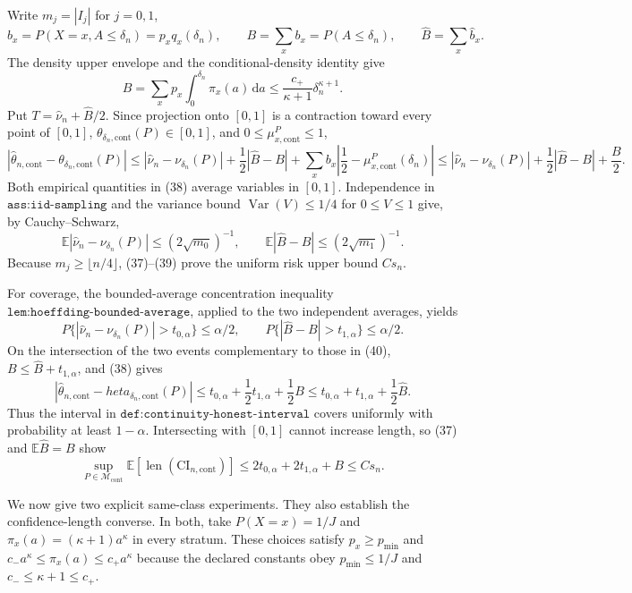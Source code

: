 Write \(m_j=|I_j|\) for \(j=0,1\),
\[
 b_x=P(X=x,A\leq\delta_n)=p_xq_x(\delta_n),
 \qquad B=\sum_xb_x=P(A\leq\delta_n),
 \qquad \widehat B=\sum_x\widehat b_x. \tag{36}
\]
The density upper envelope and the conditional-density identity give
\[
 B=\sum_xp_x\int_0^{\delta_n}\pi_x(a)\,\mathrm da
 \leq \frac{c_+}{\kappa+1}\delta_n^{\kappa+1}. \tag{37}
\]
Put \(T=\widehat\nu_n+\widehat B/2\).  Since projection onto \([0,1]\) is a contraction toward every point of \([0,1]\), \(\theta_{\delta_n,\mathrm{cont}}(P)\in[0,1]\), and \(0\leq\mu_{x,\mathrm{cont}}^P\leq1\),
\[
 |\widehat\theta_{n,\mathrm{cont}}-\theta_{\delta_n,\mathrm{cont}}(P)|
 \leq |\widehat\nu_n-\nu_{\delta_n}(P)|
 +\frac12|\widehat B-B|
 +\sum_xb_x\left|\frac12-\mu_{x,\mathrm{cont}}^P(\delta_n)\right|
 \leq |\widehat\nu_n-\nu_{\delta_n}(P)|+\frac12|\widehat B-B|+\frac B2. \tag{38}
\]
Both empirical quantities in (38) average variables in \([0,1]\).  Independence in \(\texttt{ass:iid-sampling}\) and the variance bound \(\operatorname{Var}(V)\leq1/4\) for \(0\leq V\leq1\) give, by Cauchy--Schwarz,
\[
 \mathbb E|\widehat\nu_n-\nu_{\delta_n}(P)|\leq(2\sqrt{m_0})^{-1},
 \qquad
 \mathbb E|\widehat B-B|\leq(2\sqrt{m_1})^{-1}. \tag{39}
\]
Because \(m_j\geq\lfloor n/4\rfloor\), (37)--(39) prove the uniform risk upper bound \(Cs_n\).

For coverage, the bounded-average concentration inequality \(\texttt{lem:hoeffding-bounded-average}\), applied to the two independent averages, yields
\[
 P\{|\widehat\nu_n-\nu_{\delta_n}(P)|>t_{0,\alpha}\}\leq\alpha/2,
 \qquad
 P\{|\widehat B-B|>t_{1,\alpha}\}\leq\alpha/2. \tag{40}
\]
On the intersection of the two events complementary to those in (40), \(B\leq\widehat B+t_{1,\alpha}\), and (38) gives
\[
 |\widehat\theta_{n,\mathrm{cont}}-  heta_{\delta_n,\mathrm{cont}}(P)|
 \leq t_{0,\alpha}+\frac12t_{1,\alpha}+\frac12B
 \leq t_{0,\alpha}+t_{1,\alpha}+\frac12\widehat B. \tag{41}
\]
Thus the interval in \(\texttt{def:continuity-honest-interval}\) covers uniformly with probability at least \(1-\alpha\).  Intersecting with \([0,1]\) cannot increase length, so (37) and \(\mathbb E\widehat B=B\) show
\[
 \sup_{P\in\mathcal M_{\mathrm{cont}}}
 \mathbb E[\operatorname{len}(\mathrm{CI}_{n,\mathrm{cont}})]
 \leq2t_{0,\alpha}+2t_{1,\alpha}+B
 \leq Cs_n. \tag{42}
\]

We now give two explicit same-class experiments.  They also establish the confidence-length converse.  In both, take \(P(X=x)=1/J\) and \(\pi_x(a)=(\kappa+1)a^\kappa\) in every stratum.  These choices satisfy \(p_x\geq p_{\min}\) and \(c_-a^\kappa\leq\pi_x(a)\leq c_+a^\kappa\) because the declared constants obey \(p_{\min}\leq1/J\) and \(c_-\leq\kappa+1\leq c_+\).

